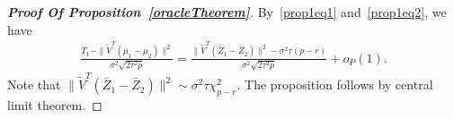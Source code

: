 \documentclass[review]{elsarticle}
\theoremstyle{plain}
\theoremstyle{definition}
\theoremstyle{remark}
\begin{document}
\begin{proof}[\textbf{Proof Of Proposition~\ref{oracleTheorem}}]
    By~\eqref{prop1eq1} and~\eqref{prop1eq2}, we have
    \begin{equation}
        \begin{aligned}
            \frac{T_1-\|\tilde{V}^T(\mu_1-\mu_2)\|^2}{\sigma^2\sqrt{2\tau^2 p}}
            =
            \frac{\|\tilde{V}^T(\bar{Z}_1-\bar{Z}_2)\|^2-
                \sigma^2 \tau (p-r)}{\sigma^2\sqrt{2\tau^2 p}}
                +o_P(1).
        \end{aligned}
    \end{equation}
Note that
$\|\tilde{V}^T(\bar{Z}_1-\bar{Z}_2)\|^2\sim \sigma^2\tau\chi^2_{p-r}$.
The proposition follows by central limit theorem.
\end{proof}







\end{document}
